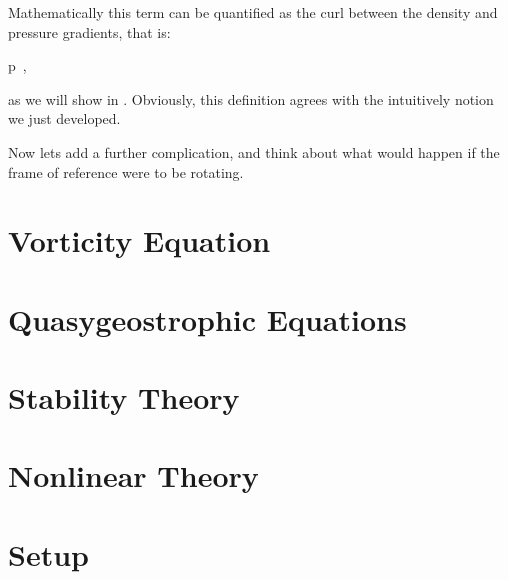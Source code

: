 Mathematically this term can be quantified as the curl between the density and pressure gradients, that is:

\beq
{} \nabla \rho \times \nabla p
\,,

as we will show in . Obviously, this definition agrees with the intuitively notion we just developed.

Now lets add a further complication, and think about what would happen if the frame of reference were to be rotating. %


\section{Vorticity Equation}
\label{s:vorticity}
\section{Quasygeostrophic Equations}
\label{s:qg}
\section{Stability Theory}
\label{s:stability}
\section{Nonlinear Theory}
\label{s:nonlinear}
\section{Setup}
\label{s:setup}

